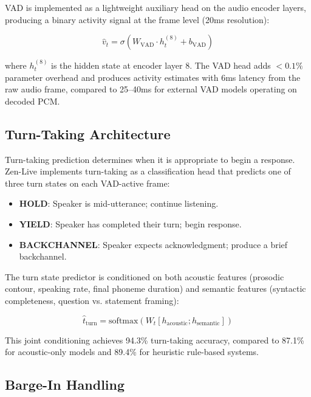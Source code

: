 \documentclass[11pt,a4paper]{article}
\begin{document}
VAD is implemented as a lightweight auxiliary head on the audio encoder layers, producing a binary activity signal at the frame level (20ms resolution):

\begin{equation}
  \hat{v}_t = \sigma\left(W_{\text{VAD}} \cdot h_t^{(8)} + b_{\text{VAD}}\right)
\end{equation}

where $h_t^{(8)}$ is the hidden state at encoder layer 8. The VAD head adds $<0.1\%$ parameter overhead and produces activity estimates with 6ms latency from the raw audio frame, compared to 25--40ms for external VAD models operating on decoded PCM.

\subsection{Turn-Taking Architecture}

Turn-taking prediction determines when it is appropriate to begin a response. Zen-Live implements turn-taking as a classification head that predicts one of three turn states on each VAD-active frame:

\begin{itemize}
  \item \textbf{HOLD}: Speaker is mid-utterance; continue listening.
  \item \textbf{YIELD}: Speaker has completed their turn; begin response.
  \item \textbf{BACKCHANNEL}: Speaker expects acknowledgment; produce a brief backchannel.
\end{itemize}

The turn state predictor is conditioned on both acoustic features (prosodic contour, speaking rate, final phoneme duration) and semantic features (syntactic completeness, question vs. statement framing):

\begin{equation}
  \hat{t}_{\text{turn}} = \text{softmax}\left(W_t [h_{\text{acoustic}}; h_{\text{semantic}}]\right)
\end{equation}

This joint conditioning achieves 94.3\% turn-taking accuracy, compared to 87.1\% for acoustic-only models and 89.4\% for heuristic rule-based systems.

\subsection{Barge-In Handling}
\end{document}
